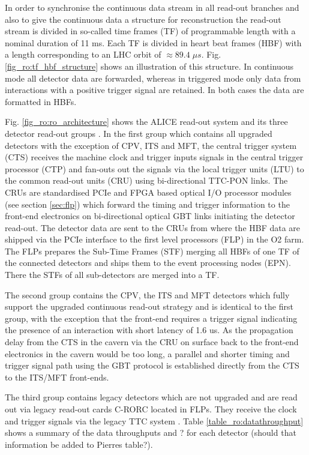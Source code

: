 In order to synchronise the continuous data stream in all read-out branches and also to give the continuous data a structure for reconstruction the read-out stream is divided in so-called time frames (TF) of programmable length with a nominal duration of 11 ms. Each TF is divided in heart beat frames (HBF) with a length corresponding to an LHC orbit of $\approx 89.4\; \mu s$. Fig. \ref{fig_ro:tf_hbf_structure} shows an illustration of this structure. In continuous mode all detector data are forwarded, whereas in triggered mode only data from interactions with a positive trigger signal are retained. In both cases the data are formatted in HBFs.

Fig. \ref{fig_ro:ro_architecture}  shows the ALICE read-out system and its three detector read-out groups \cite{TDR, run34note}. In the first group which contains all upgraded detectors with the exception of CPV, ITS and MFT, the central trigger system (CTS) receives the machine clock and trigger inputs signals in the central trigger processor (CTP) and fan-outs out the signals via the local trigger units (LTU) to the common read-out units (CRU) using bi-directional TTC-PON links. The CRUs are standardised PCIe and FPGA based optical I/O processor modules (see section \ref{sec:flp}) which forward the timing and trigger information to the front-end electronics on bi-directional optical GBT links \cite{ro:GBT} initiating the detector read-out. The detector data are sent to the CRUs  from where the HBF data are shipped via the PCIe interface to the first level processors (FLP) in the O2 farm. The FLPs prepares the Sub-Time Frames (STF) merging all HBFs of one TF of the connected detectors and ships them to the event processing nodes (EPN). There the STFs of all sub-detectors are merged into a TF. 

The second group contains the CPV, the ITS and MFT detectors which fully support the upgraded continuous read-out strategy and is identical to the first group, with the exception that the front-end requires a trigger signal indicating the presence of an interaction with short latency of 1.6 us. As the propagation delay from the CTS in the cavern via the CRU on surface back to the front-end electronics in the cavern would be too long, a parallel and shorter timing and trigger signal path using the GBT protocol is established directly from the CTS to the ITS/MFT front-ends. 

The third group contains legacy detectors which are not upgraded and are read out via legacy read-out cards C-RORC  \cite{ro:CRORC} located in FLPs. They receive the clock and trigger signals via the legacy TTC system \cite{ro:TTC}. Table \ref{table_ro:datathroughput} shows a summary of the data throughputs and ? for each detector (should that information be added to Pierres table?).

